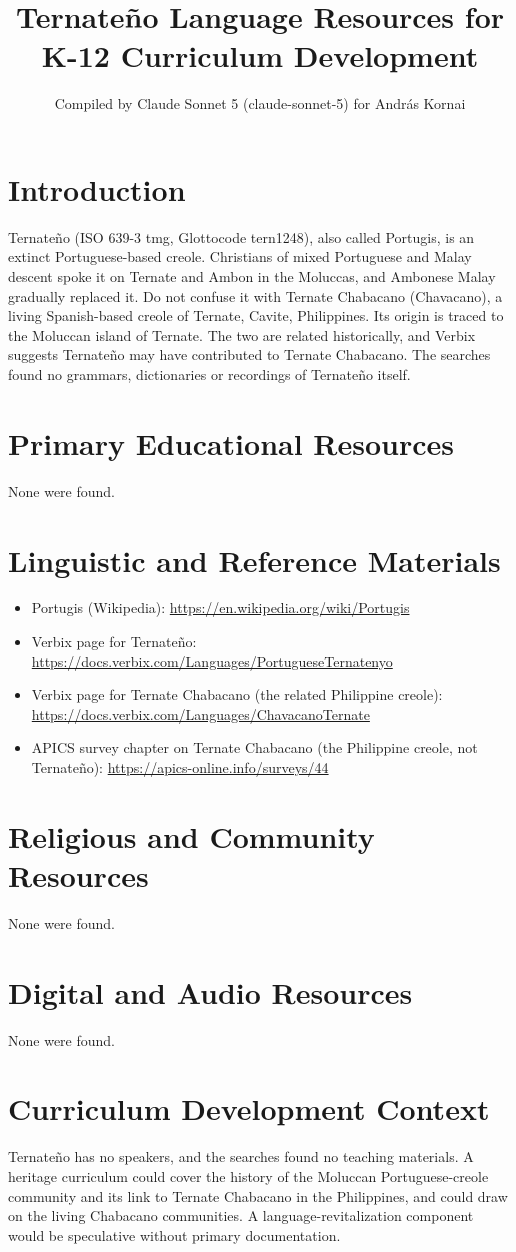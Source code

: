 \documentclass[12pt]{article}
\title{Ternate\~no Language Resources for K-12 Curriculum Development}
\author{Compiled by Claude Sonnet 5 (claude-sonnet-5) for Andr\'as Kornai}
\date{}
\begin{document}
\maketitle

\section{Introduction}
Ternate\~no (ISO 639-3 tmg, Glottocode tern1248), also called Portugis, is an extinct Portuguese-based creole. Christians of mixed Portuguese and Malay descent spoke it on Ternate and Ambon in the Moluccas, and Ambonese Malay gradually replaced it. Do not confuse it with Ternate Chabacano (Chavacano), a living Spanish-based creole of Ternate, Cavite, Philippines. Its origin is traced to the Moluccan island of Ternate. The two are related historically, and Verbix suggests Ternate\~no may have contributed to Ternate Chabacano. The searches found no grammars, dictionaries or recordings of Ternate\~no itself.

\section{Primary Educational Resources}
None were found.

\section{Linguistic and Reference Materials}
\begin{itemize}
\item Portugis (Wikipedia): \url{https://en.wikipedia.org/wiki/Portugis}
\item Verbix page for Ternate\~no: \url{https://docs.verbix.com/Languages/PortugueseTernatenyo}
\item Verbix page for Ternate Chabacano (the related Philippine creole): \url{https://docs.verbix.com/Languages/ChavacanoTernate}
\item APICS survey chapter on Ternate Chabacano (the Philippine creole, not Ternate\~no): \url{https://apics-online.info/surveys/44}
\end{itemize}

\section{Religious and Community Resources}
None were found.

\section{Digital and Audio Resources}
None were found.

\section{Curriculum Development Context}
Ternate\~no has no speakers, and the searches found no teaching materials. A heritage curriculum could cover the history of the Moluccan Portuguese-creole community and its link to Ternate Chabacano in the Philippines, and could draw on the living Chabacano communities. A language-revitalization component would be speculative without primary documentation.
\end{document}
